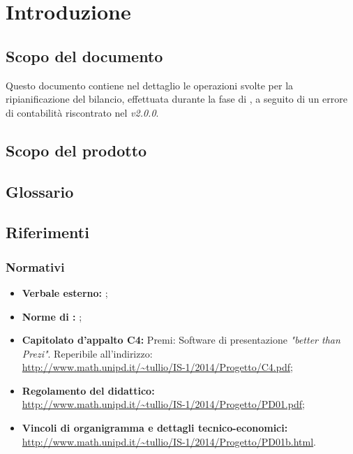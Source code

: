 \section{Introduzione}\label{intro}
\subsection{Scopo del documento}
Questo documento contiene nel dettaglio le operazioni svolte per la ripianificazione del bilancio, effettuata durante la fase di \fC, a seguito di un errore di contabilità riscontrato nel \PP \emph{v2.0.0}.
\subsection{Scopo del prodotto}
\scopoProdotto
\subsection{Glossario}
\descrizioneGlossario
\subsection{Riferimenti}
\subsubsection{Normativi}
\begin{itemize}
\item \textbf{Verbale esterno:} \eVI;
\item \textbf{Norme di :} \normeDiProgetto;
\item \textbf{Capitolato d'appalto C4:} Premi: Software di presentazione \emph{"better than Prezi"}. Reperibile all'indirizzo: \\ \url{http://www.math.unipd.it/~tullio/IS-1/2014/Progetto/C4.pdf};
\item \textbf{Regolamento del  didattico:} \\ \url{http://www.math.unipd.it/~tullio/IS-1/2014/Progetto/PD01.pdf};
\item \textbf{Vincoli di organigramma e dettagli tecnico-economici:} \\ \url{http://www.math.unipd.it/~tullio/IS-1/2014/Progetto/PD01b.html}.
\end{itemize}
